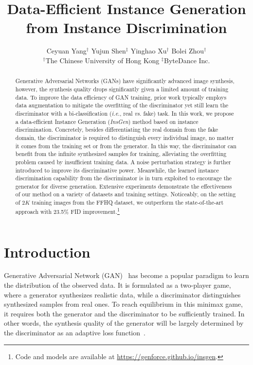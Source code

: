 \documentclass{article}
\title{Data-Efficient Instance Generation \\ from Instance Discrimination}
\author{
  Ceyuan Yang$^\dagger$ \quad
  Yujun Shen$^\ddagger$ \quad
  Yinghao Xu$^\dagger$ \quad
  Bolei Zhou$^\dagger$ \\
  $^\dagger$The Chinese University of Hong Kong \quad
  $^\ddagger$ByteDance Inc. \\
}
\begin{document}
\maketitle


\begin{abstract}
Generative Adversarial Networks (GANs) have significantly advanced image synthesis, however, the synthesis quality drops significantly given a limited amount of training data.
To improve the data efficiency of GAN training, prior work typically employs data augmentation to mitigate the overfitting of the discriminator yet still learn the discriminator with a bi-classification (\textit{i.e.}, real \textit{vs.} fake) task.
In this work, we propose a data-efficient Instance Generation (\textit{InsGen}) method based on instance discrimination.
Concretely, besides differentiating the real domain from the fake domain, the discriminator is required to distinguish every individual image, no matter it comes from the training set or from the generator.
In this way, the discriminator can benefit from the infinite synthesized samples for training, alleviating the overfitting problem caused by insufficient training data.
A noise perturbation strategy is further introduced to improve its discriminative power.
Meanwhile, the learned instance discrimination capability from the discriminator is in turn exploited to encourage the generator for diverse generation.
Extensive experiments demonstrate the effectiveness of our method on a variety of datasets and training settings.
Noticeably, on the setting of $2K$ training images from the FFHQ dataset, we outperform the state-of-the-art approach with 23.5\% FID improvement.\footnote{Code and models are available at \url{https://genforce.github.io/insgen}.}
\end{abstract}


\section{Introduction}\label{sec:intro}


Generative Adversarial Network (GAN)~\cite{goodfellow2014generative} has become a popular paradigm to learn the distribution of the observed data.
It is formulated as a two-player game, where a generator synthesizes realistic data, while a discriminator distinguishes synthesized samples from real ones.
To reach equilibrium in this minimax game, it requires both the generator and the discriminator to be sufficiently trained.
In other words, the synthesis quality of the generator will be largely determined by the discriminator as an adaptive loss function~\cite{karras2020training, tran2021data, zhao2020differentiable, zhao2020image}.
\end{document}
